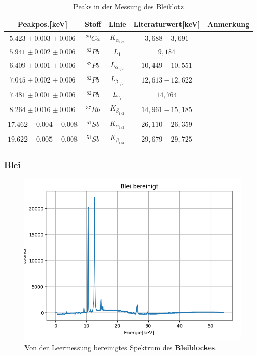 \documentclass[12pt,a4paper]{article}
\begin{document}
\begin{table}[H]
\center
\begin{tabular}{|c|c|c|c|c|}
\hline 
Peakpos.[keV] & Stoff & Linie & Literaturwert[keV] & Anmerkung \\
\hline 
$5.423 \pm 0.003 \pm 0.006$& $^{20}Ca$ & $K_{\alpha_{1/2}}$ & $3,688-3,691$ & \\
\hline 
$5.941 \pm 0.002 \pm 0.006$ & $^{82}Pb$ & $L_{1}$ & $9,184$ & \\ 
\hline 
$6.409 \pm 0.001 \pm 0.006$ & $^{82}Pb$ & $L_{\alpha_{1/2}}$ & $10,449-10,551$ & \\
\hline
$7.045 \pm 0.002 \pm 0.006$ & $^{82}Pb$ & $L_{\beta_{1/2}}$ & $12,613-12,622$ & \\
\hline
$7.481 \pm 0.001 \pm 0.006$ & $^{82}Pb$ & $L_{\gamma_{1}}$ & $14,764$ & \\
\hline
$8.264 \pm 0.016 \pm 0.006$ & $^{37}Rb$ & $K_{\beta_{1/2}}$ & $14,961-15,185$ & \\
\hline
$17.462 \pm 0.004 \pm 0.008$ & $^{51}Sb$ & $K_{\alpha_{1/2}}$ & $26,110-26,359$ & \\
\hline
$19.622 \pm 0.005 \pm 0.008$ & $^{51}Sb$ & $K_{\beta_{1/3}}$ & $29,679-29,725$ & \\
\hline
\end{tabular} 
\caption{Peaks in der Messung des Bleiklotz}
\label{prob_stahl}
\end{table}

\newpage
\subsubsection{Blei}
\begin{figure}[H]
\centering
\includegraphics[scale=1]{Bilder/roentgen_spektren/blei_0.png}
\caption{Von der Leermessung bereinigtes Spektrum des \textbf{Bleiblockes}.}
\label{fig:prop_blei}
\end{figure}
\end{document}
